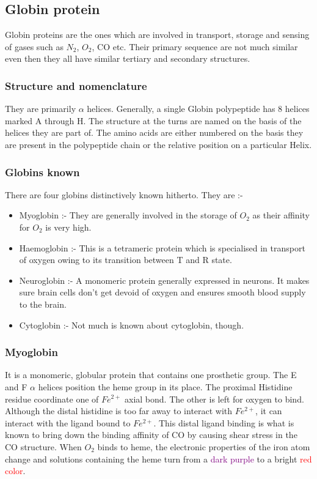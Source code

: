 \documentclass[12pt]{article}
\begin{document}
\subsection{Globin protein}
Globin proteins are the ones which are involved in transport, storage and sensing of gases such as $N_{2}$, $O_{2}$, CO etc. Their primary sequence are not much similar even then they all have similar tertiary and secondary structures.
\subsubsection{Structure and nomenclature}
They are primarily $\alpha$ helices. Generally, a single Globin polypeptide has 8 helices marked A through H. The structure at the turns are named on the basis of the helices they are part of. The amino acids are either numbered on the basis they are present in the polypeptide chain or the relative position on a particular Helix. 
\subsubsection{Globins known}
There are four globins distinctively known hitherto. They are :-
\begin{itemize}
\item Myoglobin :- They are generally involved in the storage of $O_{2}$ as their affinity for $O_{2}$ is very high.
\item Haemoglobin :- This is a tetrameric protein which is specialised in transport of oxygen owing to its transition between T and R state.
\item Neuroglobin :- A monomeric protein generally expressed in neurons. It makes sure brain cells don't get devoid of oxygen and ensures smooth blood supply to the brain.
\item Cytoglobin :- Not much is known about cytoglobin, though.
\end{itemize}
\subsubsection{Myoglobin}
It is a monomeric, globular protein that contains one prosthetic group. The E and F $\alpha$ helices position the heme group in its place. The proximal Histidine residue coordinate one of $Fe^{2+}$ axial bond. The other is left for oxygen to bind. Although the distal histidine is too far away to interact with $ Fe^{2+}$, it can interact with the ligand bound to $Fe^{2+}$.
This distal ligand binding is what is known to bring down the binding affinity of CO by causing shear stress in the CO structure. When $O_{2}$ binds to heme, the electronic properties of the iron atom change and solutions containing the heme turn from a \textcolor{purple}{dark purple} to a bright \textcolor{red}{ red color}.
\clearpage
\end{document}
